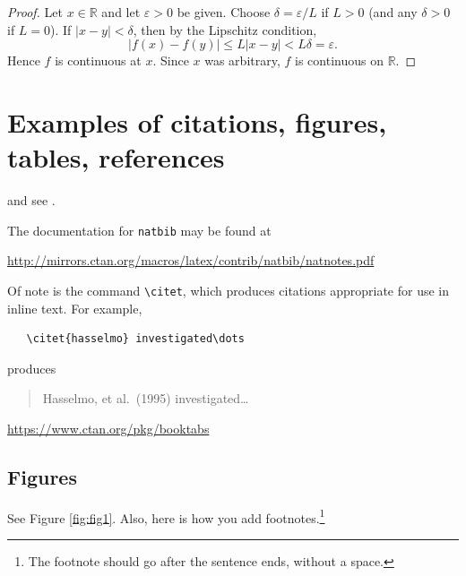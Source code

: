 \documentclass[12pt,a4paper]{article}
\theoremstyle{definition}
\begin{document}
\begin{proof}
	Let $x\in\mathbb{R}$ and let $\varepsilon>0$ be given. Choose $\delta=\varepsilon/L$ if $L>0$ (and any $\delta>0$ if $L=0$).
	If $|x-y|<\delta$, then by the Lipschitz condition,
	\begin{equation}
	|f(x)-f(y)| \le L|x-y| < L\delta = \varepsilon.
	\end{equation}
	Hence $f$ is continuous at $x$. Since $x$ was arbitrary, $f$ is continuous on $\mathbb{R}$.
\end{proof}

\section{Examples of citations, figures, tables, references}
\label{sec:others}
\lipsum[8] \cite{dabney2009linear,kour2014fast} and see \citet[page 9]{hadash2018estimate}.

The documentation for \verb+natbib+ may be found at
\begin{center}
  \url{http://mirrors.ctan.org/macros/latex/contrib/natbib/natnotes.pdf}
\end{center}
Of note is the command \verb+\citet+, which produces citations
appropriate for use in inline text.  For example,
\begin{verbatim}
   \citet{hasselmo} investigated\dots
\end{verbatim}
produces
\begin{quote}
  Hasselmo, et al.\ (1995) investigated\dots
\end{quote}

\begin{center}
  \url{https://www.ctan.org/pkg/booktabs}
\end{center}


\subsection{Figures}

See Figure \ref{fig:fig1}. Also, here is how you add footnotes.\footnote{The footnote should go after the sentence ends, without a space.} 
\end{document}
